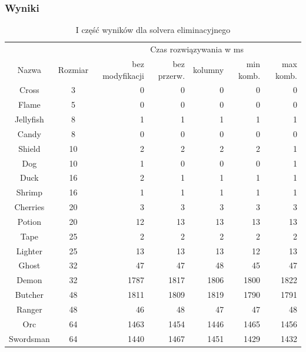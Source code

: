 \clearpage
\subsubsection{Wyniki}

\begin{table}[h!]
    \begin{center}
        \begin{tabular}{|c|c|r r r r r|}
            \hline
            {}          & {}        & \multicolumn{5}{c|}{Czas rozwiązywania w ms} \\
            Nazwa       & Rozmiar   & bez modyfikacji & bez przerw. & kolumny & min komb. & max komb. \\
            \hline
            Cross       & 3         & 0     & 0     & 0     & 0     & 0     \\
            Flame       & 5         & 0     & 0     & 0     & 0     & 0     \\
            Jellyfish   & 8         & 1     & 1     & 1     & 1     & 1     \\
            Candy       & 8         & 0     & 0     & 0     & 0     & 0     \\
            Shield      & 10        & 2     & 2     & 2     & 2     & 1     \\
            Dog         & 10        & 1     & 0     & 0     & 0     & 1     \\
            Duck        & 16        & 2     & 1     & 1     & 1     & 1     \\
            Shrimp      & 16        & 1     & 1     & 1     & 1     & 1     \\
            Cherries    & 20        & 3     & 3     & 3     & 3     & 3     \\
            Potion      & 20        & 12    & 13    & 13    & 13    & 13    \\
            Tape        & 25        & 2     & 2     & 2     & 2     & 2     \\
            Lighter     & 25        & 13    & 13    & 13    & 12    & 13    \\
            \hline
            Ghost       & 32        & 47    & 47    & 48    & 45    & 47    \\
            Demon       & 32        & 1787  & 1817  & 1806  & 1800  & 1822  \\
            Butcher     & 48        & 1811  & 1809  & 1819  & 1790  & 1791  \\
            Ranger      & 48        & 46    & 48    & 47    & 47    & 48    \\
            Orc         & 64        & 1463  & 1454  & 1446  & 1465  & 1456  \\
            Swordsman   & 64        & 1440  & 1467  & 1451  & 1429  & 1432  \\
            \hline
        \end{tabular}
    \end{center}
    \caption{I część wyników dla solvera eliminacyjnego}
\end{table}

